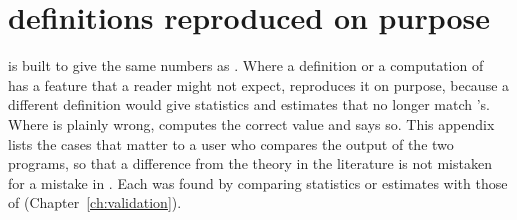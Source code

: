 \chapter{\ergm{} definitions reproduced on purpose}\label{app:quirks}\label{sec:quirks}

\nwergm{} is built to give the same numbers as \ergm{}. Where a definition or a computation of \ergm{}~\ergmver{} has a feature that a reader might not expect, \nwergm{} reproduces it on purpose, because a different definition would give statistics and estimates that no longer match \ergm{}'s. Where \ergm{} is plainly wrong, \nwergm{} computes the correct value and says so. This appendix lists the cases that matter to a user who compares the output of the two programs, so that a difference from the theory in the literature is not mistaken for a mistake in \nwergm{}. Each was found by comparing statistics or estimates with those of \ergm{} (Chapter~\ref{ch:validation}).
